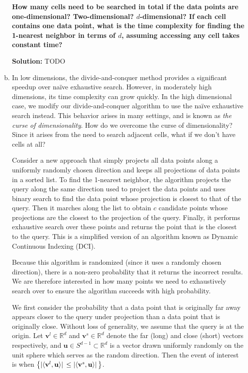 \documentclass{article}
\renewcommand{\vec}[1]{\boldsymbol{\mathbf{#1}}}
\newenvironment{solution}{\color{blue} \smallskip \textbf{Solution:}}{}
\begin{document}
\begin{enumerate}[(a)]
    {\bf How many cells need to be searched in total if the data points are one-dimensional? Two-dimensional? $d$-dimensional? 
    If each cell contains one data point, what is the time complexity for finding the 1-nearest neighbor in terms of $d$, assuming accessing any cell takes constant time?}
    
    \begin{solution}
        TODO
    \end{solution}

    \newpage
    \item 
    In low dimensions, the divide-and-conquer method provides a significant speedup over na\"{i}ve exhaustive search. 
    However, in moderately high dimensions, its time complexity can grow quickly. 
    In the high dimensional case, we modify our divide-and-conquer algorithm to use the na\"{i}ve exhaustive search instead. 
    This behavior arises in many settings, and is known as \emph{the curse of dimensionality}.
    How do we overcome the curse of dimensionality? Since it arises from the need to search adjacent cells, what if we don't have cells at all?
    
    Consider a new approach that simply projects all data points along a uniformly randomly chosen direction and keeps all projections of data points in a sorted list. 
    To find the 1-nearest neighbor, the algorithm projects the query along the same direction used to project the data points and uses binary search to find the data point whose projection is closest to that of the query. 
    Then it marches along the list to obtain $c$ candidate points whose projections are the closest to the projection of the query. 
    Finally, it performs exhaustive search over these points and returns the point that is the closest to the query. 
    This is a simplified version of an algorithm known as Dynamic Continuous Indexing (DCI).
    
    Because this algorithm is randomized (since it uses a randomly chosen direction), there is a non-zero probability that it returns the incorrect results. 
    We are therefore interested in how many points we need to exhaustively search over to ensure the algorithm succeeds with high probability.
    
    We first consider the probability that a data point that is originally far away appears closer to the query under projection than a data point that is originally close. 
    Without loss of generality, we assume that the query is at the origin. 
    Let $\vec{v}^{l} \in \mathbb{R}^{d}$ and $\vec{v}^{s} \in \mathbb{R}^{d}$ denote the far (long) and close (short) vectors respectively, and $\vec{u}\in S^{d-1}\subset\mathbb{R}^{d}$ is a vector drawn uniformly randomly on the unit sphere which serves as the random direction.
    Then the event of interest is when $\qty{\abs*{\langle\vec{v}^{l}, \vec{u}\rangle} \leq \abs*{\langle\vec{v}^{s}, \vec{u}\rangle}}$.
    

\end{enumerate}
\end{document}
